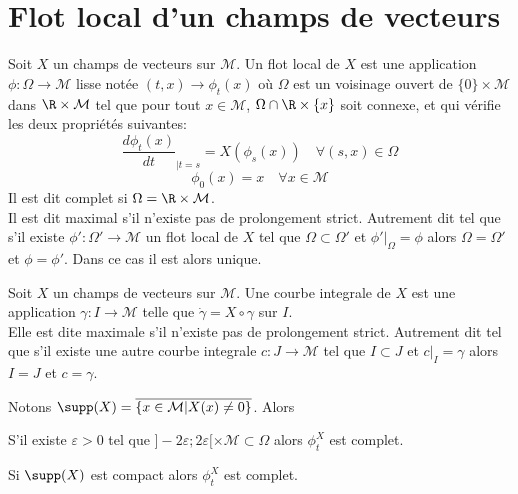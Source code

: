 \newpage
\section{Flot local d'un champs de vecteurs}

\begin{defi}
Soit $X$ un champs de vecteurs sur $\mathcal{M}$. Un flot local de $X$ est une application $\phi : \Omega \to \mathcal{M}$ lisse notée $(t,x) \to \phi_t(x)$ où $\Omega$ est un voisinage ouvert de $\{0\}\times \mathcal{M}$ dans $\R \times \mathcal{M}$ tel que pour tout $x\in \mathcal{M}$, $\Omega \cap \R \times \{x\}$ soit connexe, et qui vérifie les deux propriétés suivantes: 
$$\frac{d\phi_t(x)}{dt}_{|t=s} = X(\phi_s(x)) \quad \forall (s, x)\in \Omega$$
$$\phi_0(x) = x \quad \forall x\in \mathcal{M}$$
Il est dit complet si $\Omega = \R \times \mathcal{M}$. \\
Il est dit maximal s'il n'existe pas de prolongement strict. Autrement dit tel que s'il existe $\phi' : \Omega' \to \mathcal{M}$ un flot local de $X$ tel que $\Omega \subset \Omega'$ et $\phi'|_{\Omega} = \phi$ alors $\Omega = \Omega'$ et $\phi = \phi'$. Dans ce cas il est alors unique.
\end{defi}

\begin{defi}
Soit $X$ un champs de vecteurs sur $\mathcal{M}$. Une courbe integrale de $X$ est une application $\gamma : I \to \mathcal{M}$ telle que $\dot\gamma = X \circ \gamma$ sur $I$. \\
Elle est dite maximale s'il n'existe pas de prolongement strict. Autrement dit tel que s'il existe une autre courbe integrale $c: J \to \mathcal{M}$ tel que $I \subset J$ et $c|_I = \gamma$ alors $I = J$ et $c = \gamma$.
\end{defi}

\begin{pro}
Notons $\supp(X) = \overline{\{x\in \mathcal{M} | X(x) \neq 0\}}$. Alors 
\be
	\item S'il existe $\varepsilon > 0$ tel que $]-2\varepsilon; 2\varepsilon[\times \mathcal{M} \subset \Omega$ alors $\phi_t^X$ est complet.
	\item Si $\supp(X)$ est compact alors $\phi_t^X$ est complet.
\ee
\end{pro}

